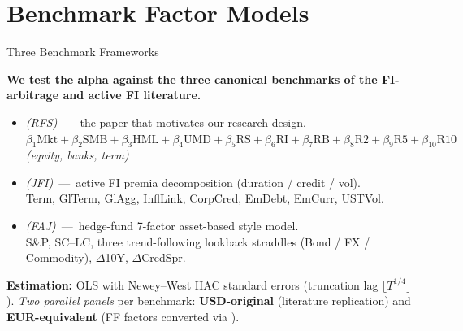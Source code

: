 \documentclass[aspectratio=169,11pt]{beamer}
\newcommand{\hlt}[1]{\textcolor{edhecred}{\textbf{#1}}}     %
\newcommand{\hltb}[1]{\textcolor{accentblue}{\textbf{#1}}}  %
\begin{document}
\section{Benchmark Factor Models}

\begin{frame}[t]{Three Benchmark Frameworks}
\small

\textbf{We test the alpha against the three canonical benchmarks of the FI-arbitrage
and active FI literature.}

\vspace{0.30cm}

\begin{itemize}\itemsep=0.20cm

  \item \hlt{\citet{duarte2007risk}} \emph{(RFS)} \,---\, the paper that motivates our
        research design.\\
        $\beta_1 \text{Mkt} + \beta_2 \text{SMB} + \beta_3 \text{HML} + \beta_4 \text{UMD}
         + \beta_5 \text{RS} + \beta_6 \text{RI} + \beta_7 \text{RB}
         + \beta_8 \text{R2} + \beta_9 \text{R5} + \beta_{10}\text{R10}$
        \hfill \textit{(equity, banks, term)}

  \item \hlt{\citet{brooks2020active}} \emph{(JFI)} \,---\, active FI premia
        decomposition (duration / credit / vol).\\
        Term, GlTerm, GlAgg, InflLink, CorpCred, EmDebt, EmCurr, USTVol.

  \item \hlt{\citet{fung2004hedge}} \emph{(FAJ)} \,---\, hedge-fund 7-factor
        asset-based style model.\\
        S\&P, SC--LC, three trend-following lookback straddles
        (Bond / FX / Commodity), $\Delta$10Y, $\Delta$CredSpr.

\end{itemize}

\vspace{0.30cm}

\textbf{Estimation:} OLS with Newey--West HAC standard errors
(truncation lag $\lfloor T^{1/4}\rfloor$). \emph{Two parallel panels}
per benchmark: \hltb{USD-original} (literature replication) and
\hltb{EUR-equivalent} (FF factors converted via \citet{gluck2021currency}).

\end{frame}
\end{document}
